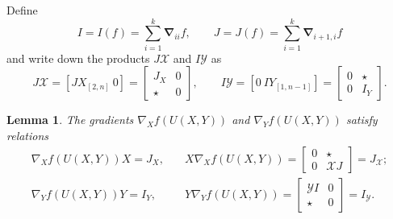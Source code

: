 \documentclass{amsart}
\newtheorem{lemma}[theorem]{Lemma}
\theoremstyle{definition}
\theoremstyle{remark}
\numberwithin{equation}{section}
\numberwithin{theorem}{section}
\begin{document}
Define
\[
 I=I(f)=\sum_{i=1}^k {\boldsymbol\nabla}_{ii} f,\qquad J=J(f)=\sum_{i=1}^{k} {\boldsymbol\nabla}_{i+1,i} f
\]
and write down the products $J{{\mathcal X}}$ and $I{{\mathcal Y}}$ as
\[
 J{{\mathcal X}}=[JX_{[2,n]}\  0]=\left [\begin{array}{cc}
J_X & 0 \\ \star & 0\end{array}\right ],\qquad
I{{\mathcal Y}}=[0\  IY_{[1,n-1]}]=\left [\begin{array}{cc}
0 & \star \\ 0 & I_Y\end{array}
\right ].
\]

\begin{lemma}\label{uhogradlemma} 
The gradients $\nabla_X f(U(X,Y))$ and $\nabla_Y f(U(X,Y))$ satisfy relations
\begin{equation}\label{uhograd}
\begin{aligned}
\nabla_X f(U(X,Y)) X = J_X, &\quad 
X \nabla_X f(U(X,Y))  = \left [\begin{array}{cc}
0 & \star \\ 0 & {{\mathcal X}} J\end{array}\right ]=J_{{\mathcal X}};\\
\nabla_Y f(U(X,Y)) Y = I_Y,
 &\quad Y \nabla_Y f(U(X,Y))  = \left [\begin{array}{cc}
{{\mathcal Y}} I & 0 \\ \star & 0\end{array}\right ]=I_{{\mathcal Y}}.
\end{aligned}
\end{equation}
\end{lemma}
\end{document}

